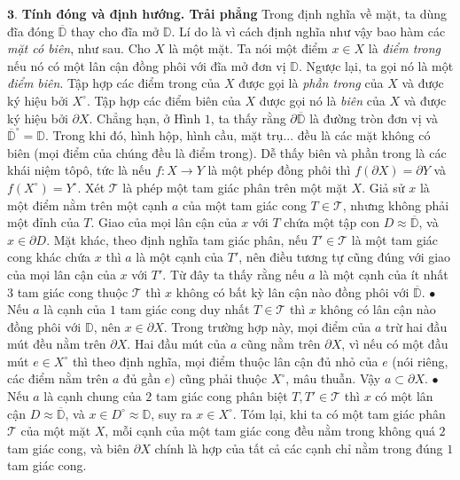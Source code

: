 \begin{multicols}{2}
	\vskip 0.1cm
	$\pmb{3.}$ \textbf{\color{duongvaotoanhoc}Tính đóng và định hướng. Trải phẳng}
	\vskip 0.1cm
	Trong định nghĩa về mặt, ta dùng đĩa đóng $\overline{\mathbb{D}}$ thay cho đĩa mở $\mathbb{D}$. Lí do là vì cách định nghĩa như vậy bao hàm các {\it mặt có biên}, như sau. Cho $X$ là một mặt. Ta nói một điểm $x \in X$ là {\it điểm trong} nếu nó có một lân cận đồng phôi với đĩa mở đơn vị $\mathbb{D}$. Ngược lại, ta gọi nó là một {\it điểm biên}. Tập hợp các điểm trong của $X$ được gọi là {\it phần trong} của $X$ và được ký hiệu bởi $X^\circ$. Tập hợp các điểm biên của $X$ được gọi nó là {\it biên} của $X$ và được ký hiệu bởi $\partial X$. 
	\vskip 0.1cm
	Chẳng hạn, ở Hình $1$, ta thấy rằng $\partial \overline{\mathbb{D}}$ là đường tròn đơn vị và $\overline{\mathbb{D}}^\circ = \mathbb{D}$. Trong khi đó, hình hộp, hình cầu, mặt trụ... đều là các mặt không có biên (mọi điểm của chúng đều là điểm trong). Dễ thấy biên và phần trong là các khái niệm tôpô, tức là nếu $f: X \to Y$ là một phép đồng phôi thì $f(\partial X) = \partial Y$ và $f(X^\circ) = Y^\circ$.
	\vskip 0.1cm
	Xét $\mathscr{T}$ là phép một tam giác phân trên một mặt $X$. Giả sử $x$ là một điểm nằm trên một cạnh $a$ của một tam giác cong $T \in \mathscr{T}$, nhưng không phải một đỉnh của $T$. Giao của mọi lân cận của $x$ với $T$ chứa một tập con $D \approx \overline{\mathbb{D}}$, và $x \in \partial D$. Mặt khác, theo định nghĩa tam giác phân, nếu $T' \in \mathscr{T}$ là một tam giác cong khác chứa $x$ thì $a$ là một cạnh của $T'$, nên điều tương tự cũng đúng với giao của mọi lân cận của $x$ với $T'$. Từ đây ta thấy rằng nếu $a$ là một cạnh của ít nhất $3$ tam giác cong thuộc $\mathscr{T}$ thì $x$ không có bất kỳ lân cận nào đồng phôi với $\overline{\mathbb{D}}$. 
	\vskip 0.1cm
	$\bullet$ Nếu $a$ là cạnh của $1$ tam giác cong duy nhất $T \in \mathscr{T}$ thì $x$ không có lân cận nào đồng phôi với $\mathbb{D}$, nên $x \in \partial X$. Trong trường hợp này, mọi điểm của $a$ trừ hai đầu mút đều nằm trên $\partial X$. Hai đầu mút của $a$ cũng nằm trên $\partial X$, vì nếu có một đầu mút $e \in X^\circ$ thì theo định nghĩa, mọi điểm thuộc lân cận đủ nhỏ của $e$ (nói riêng, các điểm nằm trên $a$ đủ gần $e$) cũng phải thuộc $X^\circ$, mâu thuẫn. Vậy $a \subset \partial X$.
	\vskip 0.1cm	
	$\bullet$ Nếu $a$ là cạnh chung của $2$ tam giác cong phân biệt $T,T' \in \mathscr{T}$ thì $x$ có một lân cận $D \approx \overline{\mathbb{D}}$, và $x \in D^\circ \approx \mathbb{D}$, suy ra $x \in X^\circ$.
	\vskip 0.1cm
	Tóm lại, khi ta có một tam giác phân $\mathscr{T}$ của một mặt $X$, mỗi cạnh của một tam giác cong đều nằm trong không quá $2$ tam giác cong, và biên $\partial X$ chính là hợp của tất cả các cạnh chỉ nằm trong đúng $1$ tam giác cong.

\end{multicols}
